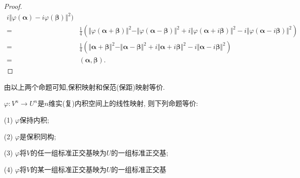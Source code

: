 \begin{example}
\begin{proof}
\begin{align*}
          i\Vert\varphi(\bm{\alpha})-i\varphi(\bm{\beta})\Vert^2)\\
    = & \frac{1}{4}(\Vert\varphi(\bm{\alpha}+\bm{\beta})\Vert^2-
        \Vert\varphi(\bm{\alpha}-\bm{\beta})\Vert^2+
        i\Vert\varphi(\bm{\alpha}+i\bm{\beta})\Vert^2-
        i\Vert\varphi(\bm{\alpha}-i\bm{\beta})\Vert^2)\\
    = & \frac{1}{4}(\Vert\bm{\alpha}+\bm{\beta}\Vert^2-
        \Vert\bm{\alpha}-\bm{\beta}\Vert^2+
        i\Vert\bm{\alpha}+i\bm{\beta}\Vert^2-
        i\Vert\bm{\alpha}-i\bm{\beta}\Vert^2)\\
    = & (\bm{\alpha},\bm{\beta}).
  \end{align*}
\end{proof}
\end{example}

\begin{notice}
  由以上两个命题可知,保积映射和保范(保距)映射等价.
\end{notice}

\begin{theorem}\label{thm:isomorphism}
  $\varphi:V^n \longrightarrow U^n$是$n$维实(复)内积空间上的线性映射,
  则下列命题等价:

  (1) $\varphi$保持内积;

  (2) $\varphi$是保积同构;

  (3) $\varphi$将$V$的任一组标准正交基映为$U$的一组标准正交基;

  (4) $\varphi$将$V$的某一组标准正交基映为$U$的一组标准正交基
\end{theorem}  

